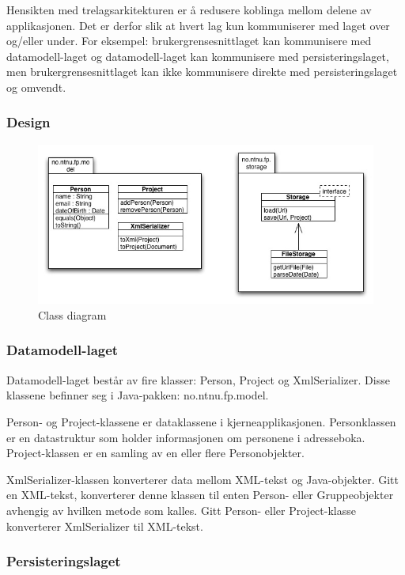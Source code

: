 Hensikten med trelagsarkitekturen er å redusere koblinga mellom delene av applikasjonen. Det er derfor slik at hvert lag kun kommuniserer med laget over og/eller under. For eksempel: brukergrensesnittlaget kan kommunisere med datamodell-laget og datamodell-laget kan kommunisere med persisteringslaget, men brukergrensesnittlaget kan ikke kommunisere direkte med persisteringslaget og omvendt.

\subsubsection{Design}

\begin{figure}[H]
    \centering
    \includegraphics[width=\textwidth]{resources/design-classdiagram.jpg}
    \caption{Class diagram}
    \label{fig:classdiagram}
\end{figure}

\subsubsection{Datamodell-laget}

Datamodell-laget består av fire klasser: Person, Project og XmlSerializer.  Disse klassene befinner seg i Java-pakken: no.ntnu.fp.model.

Person- og Project-klassene er dataklassene i kjerneapplikasjonen. Personklassen er en datastruktur som holder informasjonen om personene i adresseboka. Project-klassen er en samling av en eller flere Personobjekter.

XmlSerializer-klassen konverterer data mellom XML-tekst og Java-objekter. Gitt en XML-tekst, konverterer denne klassen til enten Person- eller Gruppeobjekter avhengig av hvilken metode som kalles. Gitt Person- eller Project-klasse konverterer XmlSerializer til XML-tekst. 

\subsubsection{Persisteringslaget}

